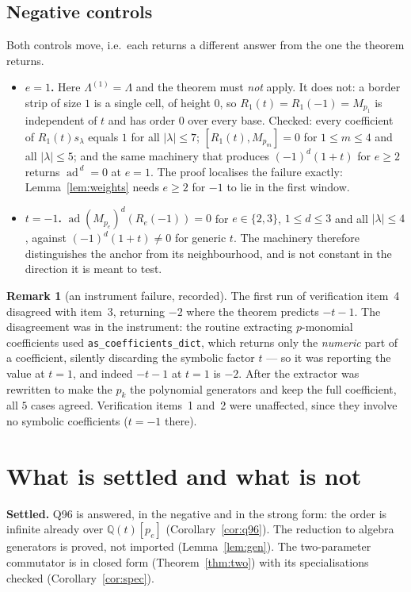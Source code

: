 \documentclass[11pt]{article}
\theoremstyle{definition}
\newtheorem{remark}[theorem]{Remark}
\DeclareMathOperator{\ad}{ad}
\newcommand{\Q}{\mathbb{Q}}
\newcommand{\Lam}{\Lambda}
\begin{document}
\subsection*{Negative controls}

Both controls move, i.e.\ each returns a different answer from the one the theorem returns.

\begin{itemize}
\item \textbf{$e=1$.}  Here $\Lam^{(1)}=\Lam$ and the theorem must \emph{not} apply.  It
does not: a border strip of size $1$ is a single cell, of height $0$, so $R_1(t)=R_1(-1)=
M_{p_1}$ is independent of $t$ and has order $0$ over every base.  Checked: every
coefficient of $R_1(t)s_\lambda$ equals $1$ for all $|\lambda|\le7$; $[R_1(t),M_{p_m}]=0$
for $1\le m\le4$ and all $|\lambda|\le5$; and the same machinery that produces
$(-1)^d(1+t)$ for $e\ge2$ returns $\ad^{\,d}=0$ at $e=1$.  The proof localises the failure
exactly: Lemma~\ref{lem:weights} needs $e\ge2$ for $-1$ to lie in the first window.
\item \textbf{$t=-1$.}  $\ad(M_{p_e})^{d}(R_e(-1))=0$ for $e\in\{2,3\}$, $1\le d\le3$ and
all $|\lambda|\le4$, against $(-1)^d(1+t)\neq0$ for generic $t$.  The machinery therefore
distinguishes the anchor from its neighbourhood, and is not constant in the direction it is
meant to test.
\end{itemize}

\begin{remark}[an instrument failure, recorded]
The first run of verification item~4 disagreed with item~3, returning $-2$ where the
theorem predicts $-t-1$.  The disagreement was in the instrument: the routine extracting
$p$-monomial coefficients used \texttt{as\_coefficients\_dict}, which returns only the
\emph{numeric} part of a coefficient, silently discarding the symbolic factor $t$ --- so it
was reporting the value at $t=1$, and indeed $-t-1$ at $t=1$ is $-2$.  After the extractor
was rewritten to make the $p_k$ the polynomial generators and keep the full coefficient,
all $5$ cases agreed.  Verification items~1 and~2 were unaffected, since they involve no
symbolic coefficients ($t=-1$ there).
\end{remark}

\section{What is settled and what is not}\label{sec:gaps}

\textbf{Settled.}  Q96 is answered, in the negative and in the strong form: the order is
infinite already over $\Q(t)[p_e]$ (Corollary~\ref{cor:q96}).  The reduction to algebra
generators is proved, not imported (Lemma~\ref{lem:gen}).  The two-parameter commutator is
in closed form (Theorem~\ref{thm:two}) with its specialisations checked
(Corollary~\ref{cor:spec}).
\end{document}
